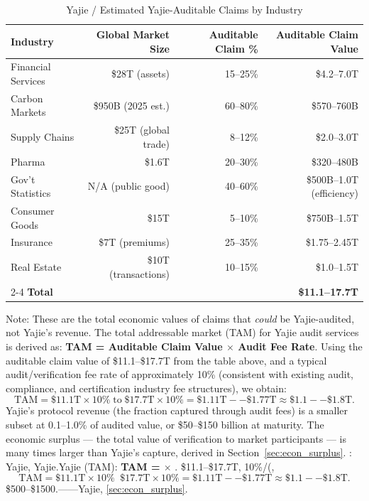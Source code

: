 \documentclass[12pt,a4paper]{article}
\theoremstyle{remark}
\begin{document}
\subsection{}
\begin{table}[H]
\centering
\caption{Yajie / Estimated Yajie-Auditable Claims by Industry}
\label{tab:audit_demand}
\begin{tabular}{@{}lrrr@{}}
\toprule
\textbf{ Industry} & \textbf{ Global Market Size} & \textbf{ Auditable Claim \%} & \textbf{ Auditable Claim Value} \\
\midrule
 Financial Services & \$28T (assets) & 15--25\% & \$4.2--7.0T \\
 Carbon Markets & \$950B (2025 est.) & 60--80\% & \$570--760B \\
 Supply Chains & \$25T (global trade) & 8--12\% & \$2.0--3.0T \\
 Pharma & \$1.6T & 20--30\% & \$320--480B \\
 Gov't Statistics & N/A (public good) & 40--60\% & \$500B--1.0T (efficiency) \\
 Consumer Goods & \$15T & 5--10\% & \$750B--1.5T \\
 Insurance & \$7T (premiums) & 25--35\% & \$1.75--2.45T \\
 Real Estate & \$10T (transactions) & 10--15\% & \$1.0--1.5T \\
\cmidrule{2-4}
\textbf{ Total} & & & \textbf{\$11.1--17.7T} \\
\bottomrule
\end{tabular}
\end{table}
Note: These are the total economic values of claims that \textit{could} be Yajie-audited, 
not Yajie's revenue. The total addressable market (TAM) for Yajie audit services is derived
as: \textbf{TAM = Auditable Claim Value $\times$ Audit Fee Rate}. Using the auditable 
claim value of \$11.1--\$17.7T from the table above, and a typical audit/verification
fee rate of approximately 10\% (consistent with existing audit, compliance, and
certification industry fee structures), we obtain:
\[\text{TAM} = \$11.1\text{T} \times 10\% \;\text{to}\; \$17.7\text{T} \times 10\% = \$1.11\text{T}--\$1.77\text{T} \approx \$1.1--\$1.8\text{T}.\]
Yajie's protocol revenue (the fraction captured through audit fees) is a smaller subset
at 0.1--1.0\% of audited value, or \$50--\$150 billion at maturity. The economic surplus
--- the total value of verification to market participants --- is many times larger than
Yajie's capture, derived in Section~\ref{sec:econ_surplus}.
\medskip
: \textit{}Yajie, Yajie.Yajie
(TAM): \textbf{TAM = $\times$ }.
\$11.1--\$17.7T, 10\%/(, 
\[\text{TAM} = \$11.1\text{T} \times 10\% \;\text{}\; \$17.7\text{T} \times 10\% = \$1.11\text{T}--\$1.77\text{T} \approx \$1.1--\$1.8\text{T}.\]
\$500--\$1500.------Yajie, 
\ref{sec:econ_surplus}.
\end{document}
